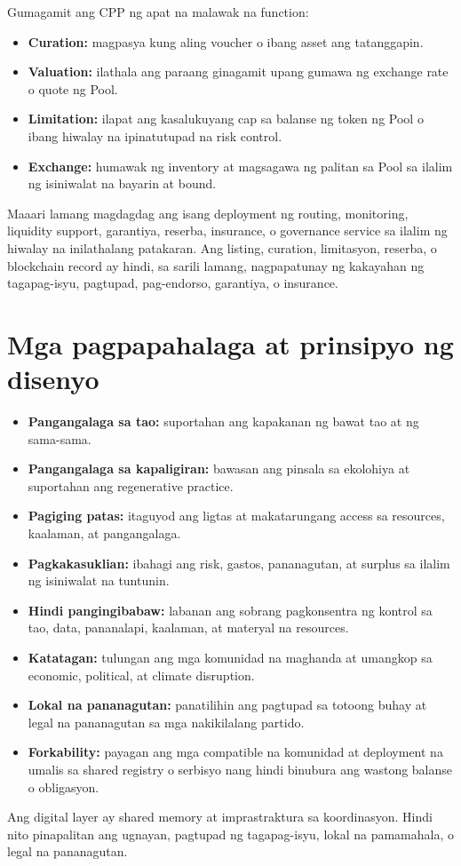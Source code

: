 \documentclass[11pt]{article}
\begin{document}
Gumagamit ang CPP ng apat na malawak na function:

\begin{itemize}[leftmargin=*]
\item \textbf{Curation:} magpasya kung aling voucher o ibang asset ang tatanggapin.
\item \textbf{Valuation:} ilathala ang paraang ginagamit upang gumawa ng exchange rate o quote ng Pool.
\item \textbf{Limitation:} ilapat ang kasalukuyang cap sa balanse ng token ng Pool o ibang hiwalay na ipinatutupad na risk control.
\item \textbf{Exchange:} humawak ng inventory at magsagawa ng palitan sa Pool sa ilalim ng isiniwalat na bayarin at bound.
\end{itemize}
Maaari lamang magdagdag ang isang deployment ng routing, monitoring, liquidity support, garantiya, reserba, insurance, o governance service sa ilalim ng hiwalay na inilathalang patakaran. Ang listing, curation, limitasyon, reserba, o blockchain record ay hindi, sa sarili lamang, nagpapatunay ng kakayahan ng tagapag-isyu, pagtupad, pag-endorso, garantiya, o insurance.

\section*{Mga pagpapahalaga at prinsipyo ng disenyo}

\begin{itemize}[leftmargin=*]
\item \textbf{Pangangalaga sa tao:} suportahan ang kapakanan ng bawat tao at ng sama-sama.
\item \textbf{Pangangalaga sa kapaligiran:} bawasan ang pinsala sa ekolohiya at suportahan ang regenerative practice.
\item \textbf{Pagiging patas:} itaguyod ang ligtas at makatarungang access sa resources, kaalaman, at pangangalaga.
\item \textbf{Pagkakasuklian:} ibahagi ang risk, gastos, pananagutan, at surplus sa ilalim ng isiniwalat na tuntunin.
\item \textbf{Hindi pangingibabaw:} labanan ang sobrang pagkonsentra ng kontrol sa tao, data, pananalapi, kaalaman, at materyal na resources.
\item \textbf{Katatagan:} tulungan ang mga komunidad na maghanda at umangkop sa economic, political, at climate disruption.
\item \textbf{Lokal na pananagutan:} panatilihin ang pagtupad sa totoong buhay at legal na pananagutan sa mga nakikilalang partido.
\item \textbf{Forkability:} payagan ang mga compatible na komunidad at deployment na umalis sa shared registry o serbisyo nang hindi binubura ang wastong balanse o obligasyon.
\end{itemize}
Ang digital layer ay shared memory at imprastraktura sa koordinasyon. Hindi nito pinapalitan ang ugnayan, pagtupad ng tagapag-isyu, lokal na pamamahala, o legal na pananagutan.
\end{document}
